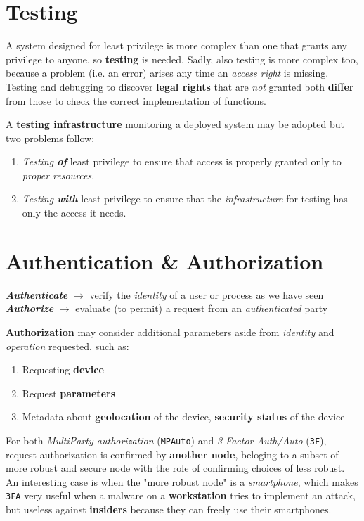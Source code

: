 \section{Testing}
A system designed for least privilege is more complex than one that grants any privilege to anyone,
so \textbf{testing} is needed.
Sadly, also testing is more complex too, because a problem (i.e. an error) arises any time an \textit{access right} is missing.
Testing and debugging to discover \textbf{legal rights} that are \textit{not} granted both
\textbf{differ} from those to check the correct implementation of functions.

A \textbf{testing infrastructure} monitoring a deployed system may be adopted but two problems follow:
\begin{enumerate}
   \item \textit{Testing \textbf{of}} least privilege to ensure that access is properly granted only to
   \textit{proper resources}.
   \item \textit{Testing \textbf{with}} least privilege to ensure that the \textit{infrastructure} for testing has only
   the access it needs.
\end{enumerate}

\section{Authentication \& Authorization}
\begin{center}
   \textit{\textbf{Authenticate}} $\longrightarrow$ verify the \textit{identity} of a user or process as we have seen\\
   \textit{\textbf{Authorize}} $\longrightarrow$ evaluate (to permit) a request from an \textit{authenticated} party
\end{center}
\textbf{Authorization} may consider additional parameters aside from \textit{identity} and \textit{operation} requested, such as:
\begin{enumerate}
   \item Requesting \textbf{device}
   \item Request \textbf{parameters}
   \item Metadata about \textbf{geolocation} of the device, \textbf{security status} of the device
\end{enumerate}

For both \textit{MultiParty authorization} (\texttt{MPAuto}) and \textit{3-Factor Auth/Auto} (\texttt{3F}), 
request authorization is confirmed by \textbf{another node},
beloging to a subset of more robust and secure node with the role of confirming choices of less robust.\\
An interesting case is when the "more robust node" is a \textit{smartphone},
which makes \texttt{3FA} very useful when a malware on a \textbf{workstation} tries to implement an attack,
but useless against \textbf{insiders} because they can freely use their smartphones.

